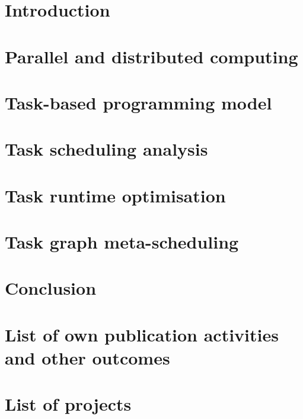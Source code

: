 \documentclass[english,phd]{diploma}
\begin{document}
\MakeTitlePages

\printglossaries

\listoffigures
\clearpage

\listoftables
\clearpage

\nocite{estee, rsds, ligate}

\chapter{Introduction}
\label{ch:Introduction}


\chapter{Parallel and distributed computing}
\label{ch:distributed-computing}


\chapter{Task-based programming model}
\label{ch:taskgraphs}


\chapter{Task scheduling analysis}
\label{ch:estee}


\chapter{Task runtime optimisation}
\label{ch:rsds}


\chapter{Task graph meta-scheduling}
\label{ch:hyperqueue}


\chapter{Conclusion}
\label{ch:conclusion}


\chapter*{List of own publication activities and other outcomes}
\label{ch:listofstudentsownpublicationactivitiesandotheroutcomes}



\chapter*{List of projects}
\label{ch:listofprojects}~


\printbibliography[heading=bibintoc, title={Bibliography}]

\end{document}
